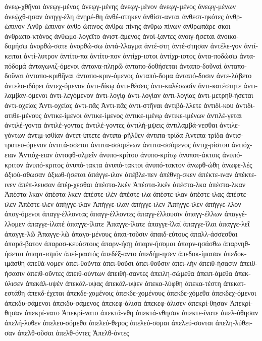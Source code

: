 {ἀνεῳ-χθῆναι
ἀνεῳγ-μένας
ἀνεῳγ-μένης
ἀνεῳγ-μένον
ἀνεῳγ-μένος
ἀνεῳγ-μένων
ἀνεῴχθ-ησαν
ἀνηγγ-έλη
ἀνῃρέ-θη
ἀνθέ-στηκεν
ἀνθίστ-ανται
ἀνθεστ-ηκότες
ἀνθρ-ώπινον
Ἀνθρ-ώπινον
ἀνθρ-ώπινος
ἀνθρω-πίνης
ἀνθρω-πίνων
ἀνθρωπάρε-σκοι
ἀνθρωπο-κτόνος
ἀνθωμο-λογεῖτο
ἀνιστ-άμενος
ἀνοί-ξαντες
ἀνοιγ-ήσεται
ἀνοικο-δομήσω
ἀνορθώ-σατε
ἀνορθώ-σω
ἀντά-λλαγμα
ἀντέ-στη
ἀντέ-στησαν
ἀντέλε-γον
ἀντί-κειται
ἀντί-λυτρον
ἀντίτυ-πα
ἀντίτυ-πον
ἀντίχρ-ιστοι
ἀντίχρ-ιστος
ἀντα-ποδώσω
ἀντα-πόδομά
ἀνταγωνιζ-όμενοι
ἀντανα-πληρῶ
ἀνταπο-δοθήσεται
ἀνταπο-δοῦναί
ἀνταπο-δοῦναι
ἀνταπο-κριθῆναι
ἀνταπο-κριν-όμενος
ἀνταπό-δομα
ἀνταπό-δοσιν
ἀντε-λάβετο
ἀντελο-ιδόρει
ἀντεχ-όμενον
ἀντι-δίκῳ
ἀντι-θέσεις
ἀντι-καλέσωσίν
ἀντι-κατέστητε
ἀντι-λαμβαν-όμενοι
ἀντι-λεγόμενον
ἀντι-λογίᾳ
ἀντι-λογίαν
ἀντι-λογίας
ἀντι-μετρηθ-ήσεται
ἀντι-οχείας
Ἀντι-οχείας
ἀντι-πᾶς
Ἀντι-πᾶς
ἀντι-στῆναι
ἀντιβά-λλετε
ἀντιδί-κου
ἀντιδι-ατιθε-μένους
ἀντικε-ίμενοι
ἀντικε-ίμενος
ἀντικε-ιμένῳ
ἀντικε-ιμένων
ἀντιλέ-γεται
ἀντιλέ-γοντα
ἀντιλέ-γοντας
ἀντιλέ-γοντες
ἀντιλή-μψεις
ἀντιλαμβά-νεσθαι
ἀντιλε-γόντων
ἀντιμ-ισθίαν
ἀντιπ-ίπτετε
ἀντιπα-ρῆλθεν
ἀντιπα-τρίδα
Ἀντιπα-τρίδα
ἀντισ-τρατευ-όμενον
ἀντιτά-σσεται
ἀντιτα-σσομένων
ἀντιτα-σσόμενος
ἀντιχ-ρίστου
ἀντιόχ-ειαν
Ἀντιόχ-ειαν
ἀντοφθ-αλμεῖν
ἀνυπο-κρίτου
ἀνυπο-κρίτῳ
ἀνυποτ-άκτοις
ἀνυπό-κριτον
ἀνυπό-κριτος
ἀνυπό-τακτα
ἀνυπό-τακτοι
ἀνυπό-τακτον
ἀνωρθ-ώθη
ἀνωφε-λές
ἀξιού-σθωσαν
ἀξιωθ-ήσεται
ἀπάγγε-ιλον
ἀπέβλε-πεν
ἀπέθνῃ-σκεν
ἀπέκτε-ιναν
ἀπέκτε-ινεν
ἀπέπ-λευσαν
ἀπέρ-χεσθαι
ἀπέστα-λκέν
Ἀπέστα-λκέν
ἀπέστα-λκα
ἀπέστα-λκαν
Ἀπέστα-λκαν
ἀπέστα-λκεν
ἀπέστε-ιλέν
ἀπέστε-ιλα
ἀπέστε-ιλαν
ἀπέστε-ιλας
ἀπέστε-ιλεν
Ἀπέστε-ιλεν
ἀπήγγε-ιλαν
Ἀπήγγε-ιλαν
ἀπήγγε-ιλεν
Ἀπήγγε-ιλεν
ἀπήγγε-λλον
ἀπαγ-όμενοι
ἀπαγγ-έλλοντας
ἀπαγγ-έλλοντες
ἀπαγγ-έλλουσιν
ἀπαγγ-έλλων
ἀπαγγέ-λλομεν
ἀπαγγε-ίλατέ
ἀπαγγε-ίλατε
Ἀπαγγε-ίλατε
ἀπαγγε-ῖλαί
ἀπαγγε-ῖλαι
ἀπαγγε-λεῖ
ἀπαγγε-λῶ
Ἀπαγγε-λῶ
ἀπαγο-μένους
ἀπαι-τοῦσιν
ἀπαιδ-εύτους
ἀπαλλ-άσσεσθαι
ἀπαρά-βατον
ἀπαρασ-κευάστους
ἀπαρν-ήσῃ
ἀπαρν-ήσομαι
ἀπαρν-ησάσθω
ἀπαρνηθ-ήσεται
ἀπαρτ-ισμόν
ἀπεί-ραστός
ἀπεδέξ-αντο
ἀπεδήμ-ησεν
ἀπεδοκ-ίμασαν
ἀπεδοκ-ιμάσθη
ἀπεθά-νομεν
ἀπει-θοῦντα
ἀπει-θοῦσι
ἀπει-θοῦσιν
ἀπει-λήν
ἀπειθ-ήσασίν
ἀπειθ-ήσασιν
ἀπειθ-οῦντες
ἀπειθ-ούντων
ἀπειθή-σαντες
ἀπειλη-σώμεθα
ἀπειπ-άμεθα
ἀπεκ-ύλισεν
ἀπεκάλ-υψέν
ἀπεκάλ-υψας
ἀπεκάλ-υψεν
ἀπεκα-λύφθη
ἀπεκα-τέστη
ἀπεκατ-εστάθη
ἀπεκδ-έχεται
ἀπεκδε-χομένοις
ἀπεκδε-χομένους
ἀπεκδε-χόμεθα
ἀπεκδεχ-όμενοι
ἀπεκδυ-σάμενοι
ἀπεκδυ-σάμενος
ἀπεκεφ-άλισα
ἀπεκεφ-άλισεν
ἀπεκρί-θησαν
Ἀπεκρί-θησαν
ἀπεκρί-νατο
Ἀπεκρί-νατο
ἀπεκτά-νθη
ἀπεκτά-νθησαν
ἀπεκτε-ίνατε
ἀπελ-ύθησαν
ἀπελή-λυθεν
ἀπελευ-σόμεθα
ἀπελεύ-θερος
ἀπελεύ-σομαι
ἀπελεύ-σονται
ἀπελη-λύθει-σαν
ἀπελθ-οῦσαι
ἀπελθ-όντες
Ἀπελθ-όντες
}
